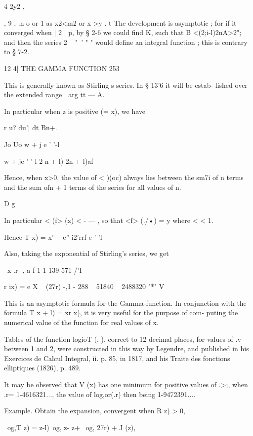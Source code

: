 4 2y2 ,   

, 9 , .n o or 1 as x2<m2 or x >y . 
t The development is asymptotic ; for if it converged when | 2 |   p, by § 2-6 we could find K, 
such that B <(2;i-l)2nA>2"; and then the series 2  ~ "~' " " would define an integral 
function ; this is contrary to § 7-2. 



12 4] THE GAMMA FUNCTION 253 

This is generally known as Stirling s series. In § 13'6 it will be estab- 
lished over the extended range | arg  tt — A. 

In particular when z is positive (= x), we have 

r  u? du'] dt Bn+. 



Jo Uo w  +  j e ' '-l 



w  +  je ' '-l 2 n + l) 2n + l)af 

Hence, when x>0, the value of < )(oc) always lies between the sm7i of 
n terms and the sum ofn + 1 terms of the series for all values of n. 

D g 

In particular < (f> (x) < - —   , so that <f> (./•) = y  where <   < 1. 

Hence T x) = x'- - e''  i2'rrf e ' 'l 

Also, taking the exponential of Stirling's series, we get 

\ x .r-   , a f 1 1 139 571   /'I 

r ix) = e   X ~ (27r) -,1   -  288  ~ 51840  ~ 2488320  "*" V  

This is an asymptotic formula for the Gamma-function. In conjunction 
with the formula T  x + l) = xr x), it is very useful for the purpose of com- 
puting the numerical value of the function for real values of x. 

Tables of the function logioT (.  ), correct to 12 decimal places, for values of .v between 
1 and 2, were constructed in this way by Legendre, and published in his Exercices de 
Calcul Integral, ii. p. 85, in 1817, and his Traite des fonctions elliptiques (1826), p. 489. 

It may be observed that V (x) has one minimum for positive values of .>;, when 
.r= 1-4616321..., the value of log,or(.r) then being 1-9472391.... 

Example. Obtain the expansion, convergent when R  z) > 0, 

\ og,T  z) =  z-l)\ og, z- z+ \ og, 27r) + J (z), 



